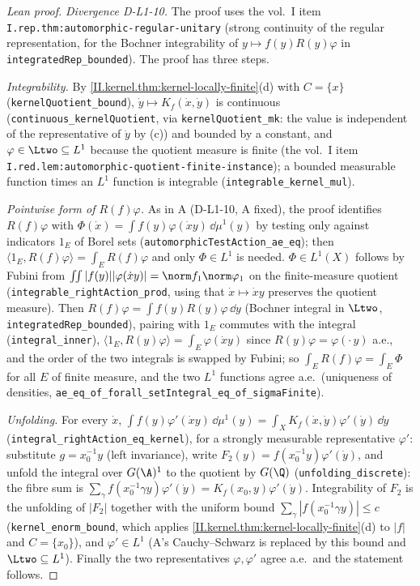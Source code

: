 \begin{proof}[Lean proof]
\emph{Divergence D-L1-10.} The proof uses the vol.\ I item \texttt{I.rep.thm:automorphic-regular-unitary} (strong continuity of the regular representation, for the Bochner integrability of $y\mapsto f(y)R(y)\varphi$ in \texttt{integratedRep\_bounded}). The proof has three steps.

\emph{Integrability.} By \cref{II.kernel.thm:kernel-locally-finite}(d) with $C=\{x\}$ (\texttt{kernelQuotient\_bound}), $\dot y\mapsto K_f(\dot x,\dot y)$ is continuous (\texttt{continuous\_kernelQuotient}, via \texttt{kernelQuotient\_mk}: the value is independent of the representative of $\dot y$ by (c)) and bounded by a constant, and $\varphi\in\Ltwo\subseteq L^1$ because the quotient measure is finite (the vol.\ I item \texttt{I.red.lem:automorphic-quotient-finite-instance}); a bounded measurable function times an $L^1$ function is integrable (\texttt{integrable\_kernel\_mul}).

\emph{Pointwise form of $R(f)\varphi$.} As in A (D-L1-10, A fixed), the proof identifies $R(f)\varphi$ with $\Phi(\dot x)=\int f(y)\varphi(\dot xy)\,\dd\mu^1(y)$ by testing only against indicators $1_E$ of Borel sets (\texttt{automorphicTestAction\_ae\_eq}); then $\langle 1_E,R(f)\varphi\rangle=\int_ER(f)\varphi$ and only $\Phi\in L^1$ is needed. $\Phi\in L^1(X)$ follows by Fubini from $\int\!\!\int|f(y)||\varphi(\dot xy)|=\norm f_1\norm\varphi_1$ on the finite-measure quotient (\texttt{integrable\_rightAction\_prod}, using that $\dot x\mapsto\dot xy$ preserves the quotient measure). Then $R(f)\varphi=\int f(y)R(y)\varphi\,\dd y$ (Bochner integral in $\Ltwo$, \texttt{integratedRep\_bounded}), pairing with $1_E$ commutes with the integral (\texttt{integral\_inner}), $\langle 1_E,R(y)\varphi\rangle=\int_E\varphi(\dot xy)$ since $R(y)\varphi=\varphi(\cdot\,y)$ a.e., and the order of the two integrals is swapped by Fubini; so $\int_ER(f)\varphi=\int_E\Phi$ for all $E$ of finite measure, and the two $L^1$ functions agree a.e.\ (uniqueness of densities, \texttt{ae\_eq\_of\_forall\_setIntegral\_eq\_of\_sigmaFinite}).

\emph{Unfolding.} For every $\dot x$, $\int f(y)\varphi'(\dot xy)\,\dd\mu^1(y)=\int_XK_f(\dot x,\dot y)\varphi'(\dot y)\,\dd\dot y$ (\texttt{integral\_rightAction\_eq\_kernel}), for a strongly measurable representative $\varphi'$: substitute $g=x_0^{-1}y$ (left invariance), write $F_2(y)=f(x_0^{-1}y)\varphi'(\dot y)$, and unfold the integral over $G(\A)^1$ to the quotient by $G(\Q)$ (\texttt{unfolding\_discrete}): the fibre sum is $\sum_\gamma f(x_0^{-1}\gamma y)\varphi'(\dot y)=K_f(x_0,y)\varphi'(\dot y)$. Integrability of $F_2$ is the unfolding of $|F_2|$ together with the uniform bound $\sum_\gamma|f(x_0^{-1}\gamma y)|\le c$ (\texttt{kernel\_enorm\_bound}, which applies \cref{II.kernel.thm:kernel-locally-finite}(d) to $|f|$ and $C=\{x_0\}$), and $\varphi'\in L^1$ (A's Cauchy--Schwarz is replaced by this bound and $\Ltwo\subseteq L^1$). Finally the two representatives $\varphi,\varphi'$ agree a.e.\ and the statement follows.
\end{proof}

